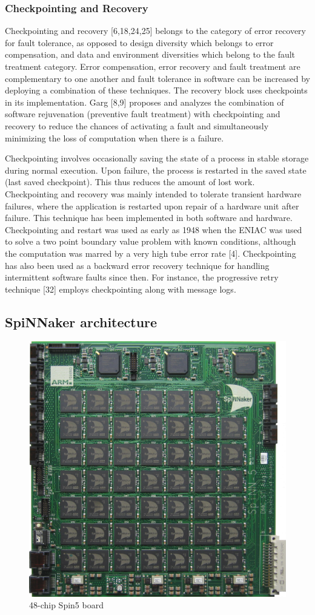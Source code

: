 \documentclass[a4paper, 11pt]{article}
\begin{document}
\subsubsection{Checkpointing and Recovery}
Checkpointing and recovery [6,18,24,25] belongs to the category of error recovery for fault tolerance, as opposed to design diversity which belongs to error compensation, and data and environment diversities which belong to the fault treatment category. Error compensation, error recovery and fault treatment are complementary to one another and fault tolerance in software can be increased by deploying a combination of these techniques. The recovery block uses checkpoints in its implementation. Garg [8,9] proposes and analyzes the combination of software rejuvenation (preventive fault treatment) with checkpointing and recovery to reduce the chances of activating a fault and simultaneously minimizing the loss of computation when there is a failure.

Checkpointing involves occasionally saving the state of a process in stable storage during normal execution. Upon failure, the process is restarted in the saved state (last saved checkpoint). This thus reduces the amount of lost work. Checkpointing and recovery was mainly intended to tolerate transient hardware failures, where the application is restarted upon repair of a hardware unit after failure. This technique has been implemented in both software and hardware. Checkpointing and restart was used as early as 1948 when the ENIAC was used to solve a two point boundary value problem with known conditions, although the computation was marred by a very high tube error rate [4]. Checkpointing has also been used as a backward error recovery technique for handling intermittent software faults since then. For instance, the progressive retry technique [32] employs checkpointing along with message logs.

\newpage
\subsection{SpiNNaker architecture}
\begin{figure}[htbp]
	\centering
	\includegraphics[width=0.6\linewidth]{images/spin5.jpg}
	\caption{48-chip Spin5 board}
\end{figure}
\end{document}
